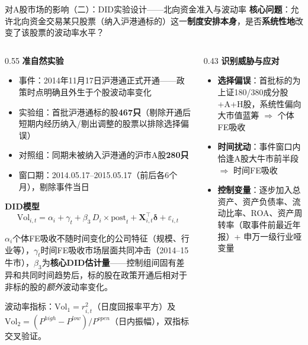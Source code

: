 \documentclass[10pt, aspectratio=169]{beamer}
\begin{document}
\begin{frame}{对A股市场的影响（二）：DID实验设计——北向资金准入与波动率}
\textbf{核心问题}：允许北向资金交易某只股票（纳入沪港通标的）这一\textbf{制度安排本身}，是否\textbf{系统性地}改变了该股票的波动率水平？

\vspace{0.2em}
\begin{columns}[T]
\begin{column}{0.55\textwidth}
\textbf{准自然实验}
\begin{itemize}\setlength\itemsep{0pt}
    \item 事件：2014年11月17日沪港通正式开通——政策时点明确且外生于个股波动率变化
    \item 实验组：首批沪港通标的股\textbf{467只}（剔除开通后短期内经历纳入/剔出调整的股票以排除选择偏误）
    \item 对照组：同期未被纳入沪港通的沪市A股\textbf{280只}
    \item 窗口期：2014.05.17--2015.05.17（前后各6个月），剔除事件当日
\end{itemize}

\vspace{0.2em}
\textbf{DID模型}
\begin{equation*}
    \text{Vol}_{i,t} = \alpha_i + \gamma_t + \beta_3\, D_i \times \text{post}_t + \mathbf{X}_{i,t}^{\top}\boldsymbol{\delta} + \varepsilon_{i,t}
\end{equation*}

$\alpha_i$个体FE吸收不随时间变化的公司特征（规模、行业等），$\gamma_t$时间FE吸收市场层面共同冲击（2014--15牛市），$\beta_3$为\textbf{核心DID估计量}——控制组间固有差异和共同时间趋势后，标的股在政策开通后相对于非标的股的\textit{额外}波动率变化。

波动率指标：$\text{Vol}_1 = r_{i,t}^2$（日度回报率平方）及$\text{Vol}_2 = (P^{high}-P^{low})/P^{open}$（日内振幅），双指标交叉验证。
\end{column}
\begin{column}{0.43\textwidth}
\textbf{识别威胁与应对}
\begin{itemize}\setlength\itemsep{0pt}
    \item \textbf{选择偏误}：首批标的为上证180/380成分股+A+H股，系统性偏向大市值蓝筹 $\Rightarrow$ 个体FE吸收
    \item \textbf{时间扰动}：事件窗口内恰逢A股大牛市前半段 $\Rightarrow$ 时间FE吸收
    \item \textbf{控制变量}：逐步加入总资产、资产负债率、流动比率、ROA、资产周转率（取事件前最近年报）+ 申万一级行业哑变量
\end{itemize}


\end{column}
\end{columns}
\end{frame}
\end{document}

